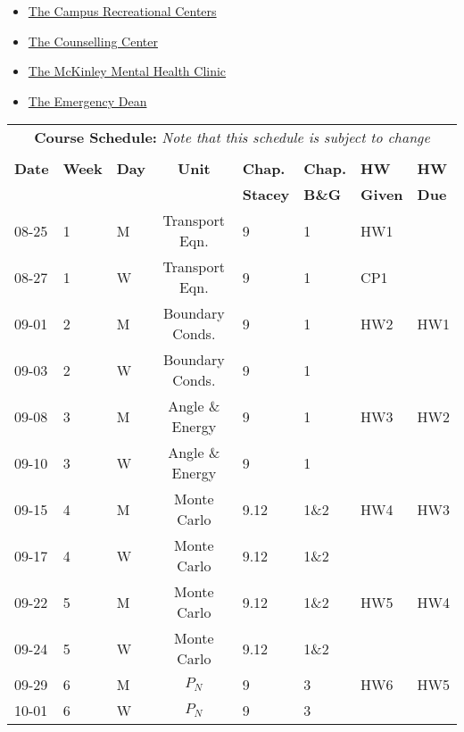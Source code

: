 \documentclass[11pt, a4paper]{article}
\begin{document}
\begin{itemize}
\item \href{https://campusrec.illinois.edu/}{The Campus Recreational Centers}
\item \href{http://counselingcenter.illinois.edu/}{The Counselling Center}
\item \href{http://www.mckinley.illinois.edu/clinics/mental\_health.htm}{The McKinley Mental Health Clinic}
\item \href{http://odos.illinois.edu/emergency/}{The Emergency Dean}
\end{itemize}

\pagebreak
\FloatBarrier
\renewcommand{\arraystretch}{1}
\begin{table}[h]
\begin{center}
\begin{tabular}{lllcllll}
\multicolumn{8}{c}{\textbf{Course Schedule:}\textit{ Note that this schedule is subject to change}}\\
&&&&&&&\\
\textbf{Date} & \textbf{Week} & \textbf{Day} & \textbf{Unit} & \textbf{Chap.} & \textbf{Chap.} & \textbf{HW} & \textbf{HW}\\
              &  &  & & \textbf{Stacey}& \textbf{B\&G} & \textbf{Given} & \textbf{Due}\\
\hline
\hline
08-25 & 1 & M  & Transport Eqn.          & 9    & 1    & HW1 &     \\
08-27 & 1 & W  & Transport Eqn.          & 9    & 1    & CP1 &     \\
09-01 & 2 & M  & Boundary Conds.         & 9    & 1    & HW2 & HW1 \\
09-03 & 2 & W  & Boundary Conds.         & 9    & 1    &     &     \\
09-08 & 3 & M  & Angle \& Energy         & 9    & 1    & HW3 & HW2 \\
09-10 & 3 & W  & Angle \& Energy         & 9    & 1    &     &     \\
09-15 & 4 & M  & Monte Carlo             & 9.12 & 1\&2 & HW4 & HW3 \\
09-17 & 4 & W  & Monte Carlo             & 9.12 & 1\&2 &     &     \\
09-22 & 5 & M  & Monte Carlo             & 9.12 & 1\&2 & HW5 & HW4 \\
09-24 & 5 & W  & Monte Carlo             & 9.12 & 1\&2 &     &     \\
09-29 & 6 & M  & $P_N$                   & 9    & 3    & HW6 & HW5 \\
10-01 & 6 & W  & $P_N$                   & 9    & 3    &     &     \\

\end{tabular}
\end{center}
\end{table}
\end{document}
